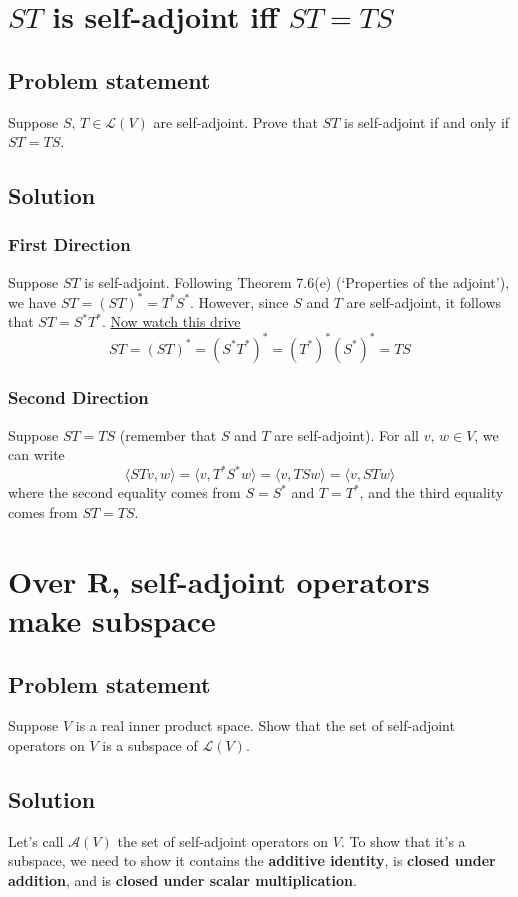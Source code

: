 \documentclass{article}
\begin{document}
\clearpage

\renewcommand{\thesection}{7}
\section{$ST$ is self-adjoint iff $ST=TS$}
\subsection*{Problem statement}
Suppose $S,\,T\in\mathcal{L}(V)$ are self-adjoint. Prove that $ST$ is self-adjoint if and only if $ST=TS$.

\subsection*{Solution}
\subsubsection*{First Direction}
Suppose $ST$ is self-adjoint. Following Theorem 7.6(e) (`Properties of the adjoint'), we have $ST=(ST)^*=T^*S^*$. However, since $S$ and $T$ are self-adjoint, it follows that $ST=S^*T^*$. \href{https://www.youtube.com/watch?v=TCm9788Tb5g}{Now watch this drive}
\[ST=(ST)^*=(S^*T^*)^*=(T^*)^*(S^*)^*=TS\]

\subsubsection*{Second Direction}
Suppose $ST=TS$ (remember that $S$ and $T$ are self-adjoint). For all $v,\,w\in V$, we can write
\[\langle STv,w\rangle=\langle v, T^*S^*w\rangle=\langle v,TSw\rangle=\langle v,STw\rangle\]
where the second equality comes from $S=S^*$ and $T=T^*$, and the third equality comes from $ST=TS$.

\clearpage

\renewcommand{\thesection}{8}
\section{Over $\mathbf{R}$, self-adjoint operators make subspace}
\subsection*{Problem statement}
Suppose $V$ is a real inner product space. Show that the set of self-adjoint operators on $V$ is a subspace of $\mathcal{L}(V)$.

\subsection*{Solution}
Let's call $\mathcal{A}(V)$ the set of self-adjoint operators on $V$. To show that it's a subspace, we need to show it contains the \textbf{additive identity}, is \textbf{closed under addition}, and is \textbf{closed under scalar multiplication}.
\end{document}

